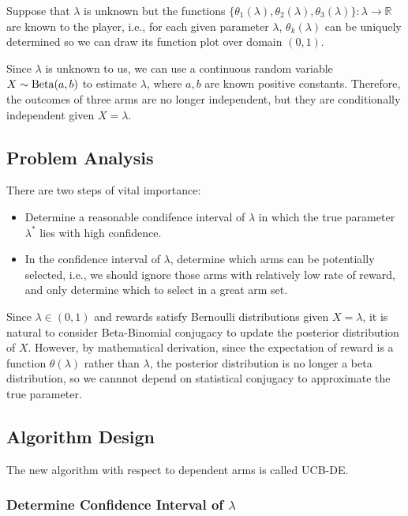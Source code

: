 \documentclass[11pt]{article}
\begin{document}
Suppose that \(\lambda\) is unknown but the functions
\(\{\theta_1(\lambda),\theta_2(\lambda),\theta_3(\lambda)\}:\lambda\to\mathbb{R}\)
are known to the player, i.e., for each given parameter \(\lambda\),
\(\theta_k(\lambda)\) can be uniquely determined so we can draw its
function plot over domain \((0,1)\).

Since \(\lambda\) is unknown to us, we can use a continuous random
variable \(X\sim{\rm Beta}(a,b)\) to estimate \(\lambda\), where \(a,b\)
are known positive constants. Therefore, the outcomes of three arms are
no longer independent, but they are conditionally independent given
\(X=\lambda\).

\hypertarget{problem-analysis}{%
\subsection{Problem Analysis}\label{problem-analysis}}

There are two steps of vital importance:

\begin{itemize}
\item
  Determine a reasonable condifence interval of \(\lambda\) in which the
  true parameter \(\lambda^*\) lies with high confidence.
\item
  In the confidence interval of \(\lambda\), determine which arms can be
  potentially selected, i.e., we should ignore those arms with
  relatively low rate of reward, and only determine which to select in a
  great arm set.
\end{itemize}

Since \(\lambda\in(0,1)\) and rewards satisfy Bernoulli distributions
given \(X=\lambda\), it is natural to consider Beta-Binomial conjugacy
to update the posterior distribution of \(X\). However, by mathematical
derivation, since the expectation of reward is a function
\(\theta(\lambda)\) rather than \(\lambda\), the posterior distribution
is no longer a beta distribution, so we cannnot depend on statistical
conjugacy to approximate the true parameter.

\hypertarget{algorithm-design}{%
\subsection{Algorithm Design}\label{algorithm-design}}

The new algorithm with respect to dependent arms is called UCB-DE.

\hypertarget{determine-confidence-interval-of-lambda}{%
\subsubsection{\texorpdfstring{Determine Confidence Interval of
\(\lambda\)}{Determine Confidence Interval of \textbackslash lambda}}\label{determine-confidence-interval-of-lambda}}
\end{document}
